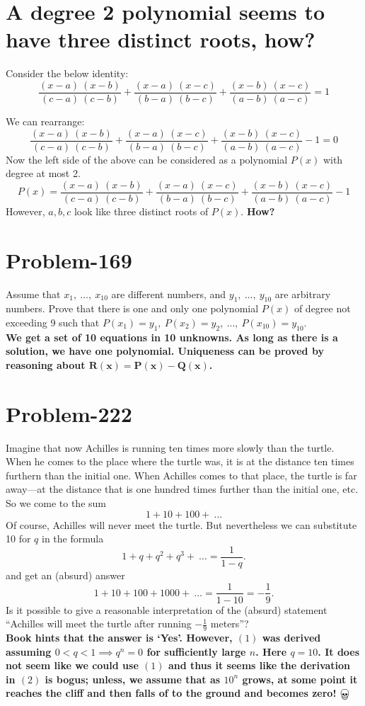 \documentclass[12pt]{article}
\begin{document}
\section*{A degree 2 polynomial seems to have three distinct roots, how?}
Consider the below identity:
\[
\frac{ (x-a)\ (x-b) }{ (c-a)\ (c-b) } + \frac{ (x-a)\ (x-c) }{ (b-a)\ (b-c) } + \frac{ (x-b)\ (x-c) }{ (a-b)\ (a-c) } = 1
\]

We can rearrange:
\[
\frac{ (x-a)\ (x-b) }{ (c-a)\ (c-b) } + \frac{ (x-a)\ (x-c) }{ (b-a)\ (b-c) } + \frac{ (x-b)\ (x-c) }{ (a-b)\ (a-c) } - 1 = 0
\]
Now the left side of the above can be considered as a polynomial $P(x)$ with degree at most 2.
\[
P(x) = \frac{ (x-a)\ (x-b) }{ (c-a)\ (c-b) } + \frac{ (x-a)\ (x-c) }{ (b-a)\ (b-c) } + \frac{ (x-b)\ (x-c) }{ (a-b)\ (a-c) } - 1
\]
However, $a, b, c$ look like three distinct roots of $P(x)$. \textbf{ How?}

\section*{Problem-169}
Assume that $x_1,\ \ldots,\ x_{10}$ are different numbers, and $y_1,\ \ldots,\ y_{10}$ are arbitrary numbers. Prove that there is one and only one polynomial $P(x)$ of degree not exceeding 9 such that $P(x_1) = y_1,\ P(x_2) = y_2,\ \ldots,\ P(x_{10}) = y_{10}$.\\

\textbf{We get a set of 10 equations in 10 unknowns. As long as there is a solution, we have one polynomial. Uniqueness can be proved by reasoning about $\boldsymbol{R(x) = P(x)-Q(x)}$.}

\section*{Problem-222}
Imagine that now Achilles is running ten times more slowly than the turtle. When he comes to the place where the turtle was, it is at the distance ten times furthern than the initial one. When Achilles comes to that place, the turtle is far away---at the distance that is one hundred times further than the initial one, etc. So we come to the sum
\[
	1 + 10 + 100 +\ \ldots
\]
Of course, Achilles will never meet the turtle. But nevertheless we can substitute 10 for $q$ in the formula
\begin{equation}
	1 + q + q^2 + q^3 +\ \ldots = \frac{1}{1-q}.
\end{equation}
and get an (absurd) answer
\begin{equation}
	1 + 10 + 100 + 1000 +\ \ldots = \frac{1}{1-10} = -\frac{1}{9}.
\end{equation}
Is it possible to give a reasonable interpretation of the (absurd) statement ``Achilles will meet the turtle after running $-\frac{1}{9}$ meters''?\\

\textbf{Book hints that the answer is `Yes'. However, $(1)$ was derived assuming $0 < q < 1 \implies q^n = 0$ for sufficiently large $n$. Here $q = 10$. It does not seem like we could use $(1)$ and thus it seems like the derivation in $(2)$ is bogus; unless, we assume that as $10^n$ grows, at some point it reaches the cliff and then falls of to the ground and becomes zero! $\bigskull$}
\end{document}
